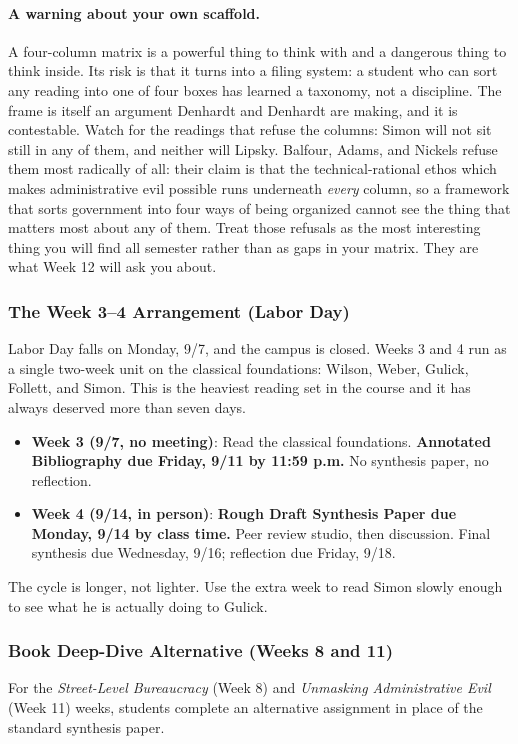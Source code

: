 \documentclass[11pt]{article}     %
\begin{document}
\paragraph*{A warning about your own scaffold.} A four-column matrix is a powerful thing to think with and a dangerous thing to think inside. Its risk is that it turns into a filing system: a student who can sort any reading into one of four boxes has learned a taxonomy, not a discipline. The frame is itself an argument Denhardt and Denhardt are making, and it is contestable. Watch for the readings that refuse the columns: Simon will not sit still in any of them, and neither will Lipsky. Balfour, Adams, and Nickels refuse them most radically of all: their claim is that the technical-rational ethos which makes administrative evil possible runs underneath \emph{every} column, so a framework that sorts government into four ways of being organized cannot see the thing that matters most about any of them. Treat those refusals as the most interesting thing you will find all semester rather than as gaps in your matrix. They are what Week 12 will ask you about.

\subsubsection*{The Week 3--4 Arrangement (Labor Day)}

Labor Day falls on Monday, 9/7, and the campus is closed. Weeks 3 and 4 run as a single two-week unit on the classical foundations: Wilson, Weber, Gulick, Follett, and Simon. This is the heaviest reading set in the course and it has always deserved more than seven days.

\begin{itemize}
    \item \textbf{Week 3 (9/7, no meeting)}: Read the classical foundations. \textbf{Annotated Bibliography due Friday, 9/11 by 11:59 p.m.} No synthesis paper, no reflection.
    \item \textbf{Week 4 (9/14, in person)}: \textbf{Rough Draft Synthesis Paper due Monday, 9/14 by class time.} Peer review studio, then discussion. Final synthesis due Wednesday, 9/16; reflection due Friday, 9/18.
\end{itemize}

\noindent The cycle is longer, not lighter. Use the extra week to read Simon slowly enough to see what he is actually doing to Gulick.

\subsubsection*{Book Deep-Dive Alternative (Weeks 8 and 11)}
For the \textit{Street-Level Bureaucracy} (Week 8) and \textit{Unmasking Administrative Evil} (Week 11) weeks, students complete an alternative assignment in place of the standard synthesis paper.
\end{document}
